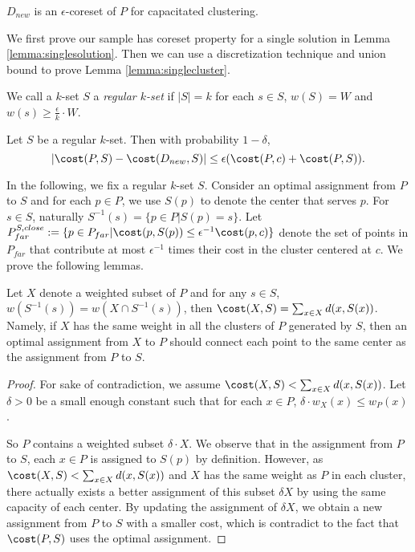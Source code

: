 \begin{lemma} \label{lemma:singlecluster}
$D_{new}$ is an $\epsilon$-coreset of $P$ for capacitated clustering.
\end{lemma}

We first prove our sample has coreset property for a single solution in Lemma \ref{lemma:singlesolution}. Then we can use a discretization technique and union bound to prove Lemma \ref{lemma:singlecluster}.

We call a $k$-set $S$ a \emph{regular $k$-set} if $|S|=k$ for each $s\in S$, $w(S)=W$ and $w(s)\geq \frac{\epsilon}{k}\cdot W$.
\begin{lemma} \label{lemma:singlesolution}
Let $S$ be a regular $k$-set. Then with probability $1-\delta$, 
$$
|\cost(P,S)-\cost(D_{new},S)|\leq \epsilon (\cost(P,c)+\cost(P,S)).
$$
\end{lemma}

In the following, we fix a regular $k$-set $S$. Consider an optimal assignment from $P$ to $S$ and for each $p\in P$, we use $S(p)$ to denote the center that serves $p$. For $s\in S$, naturally $S^{-1}(s)=\{p\in P|S(p)=s\}$. Let $P^{S,close}_{far}:=\{p\in P_{far}| \cost(p,S(p))\leq \epsilon^{-1}\cost(p,c)\}$ denote the set of points in $P_{far}$ that contribute at most $\epsilon^{-1}$ times their cost in the cluster centered at $c$. We prove the following lemmas.

\begin{lemma} \label{lemma:assignment}
Let $X$ denote a weighted subset of $P$ and for any $s\in S$, $w(S^{-1}(s))=w(X\cap S^{-1}(s))$, then
$\cost(X,S)=\sum_{x\in X} d(x,S(x))$. Namely, if $X$ has the same weight in all the clusters of $P$ generated by $S$, then an optimal assignment from $X$ to $P$ should connect each point to the same center as the assignment from $P$ to $S$.

\end{lemma}

\begin{proof}
For sake of contradiction, we assume $\cost(X,S)<\sum_{x\in X} d(x,S(x))$. Let $\delta>0$ be a small enough constant such that for each $x\in P$, $\delta \cdot w_X(x)\leq w_P(x)$. 

So $P$ contains a weighted subset $\delta\cdot X$. We observe that in the assignment from $P$ to $S$, each $x\in P$ is assigned to $S(p)$ by definition. However, as $\cost(X,S)<\sum_{x\in X} d(x,S(x))$ and $X$ has the same weight as $P$ in each cluster, there actually exists a better assignment of this subset $\delta X$ by using the same capacity of each center. By updating the assignment of $\delta X$, we obtain a new assignment from $P$ to $S$ with a smaller cost, which is contradict to the fact that $\cost(P,S)$ uses the optimal assignment.
\end{proof}



